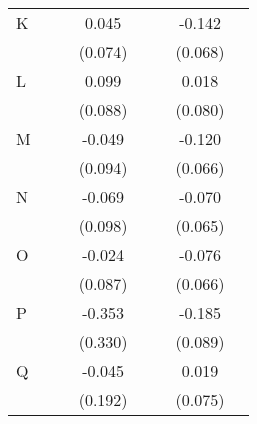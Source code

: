 \begin{longtable}{l*{3}{c}|l*{3}{c}}
		K                   &                     &                     &       0.045         &                     &                     &      -0.142\sym{*}  \\
		&                     &                     &     (0.074)         &                     &                     &     (0.068)         \\
		L                   &                     &                     &       0.099         &                     &                     &       0.018         \\
		&                     &                     &     (0.088)         &                     &                     &     (0.080)         \\
		M                   &                     &                     &      -0.049         &                     &                     &      -0.120         \\
		&                     &                     &     (0.094)         &                     &                     &     (0.066)         \\
		N                   &                     &                     &      -0.069         &                     &                     &      -0.070         \\
		&                     &                     &     (0.098)         &                     &                     &     (0.065)         \\
		O                   &                     &                     &      -0.024         &                     &                     &      -0.076         \\
		&                     &                     &     (0.087)         &                     &                     &     (0.066)         \\
		P                   &                     &                     &      -0.353         &                     &                     &      -0.185\sym{*}  \\
		&                     &                     &     (0.330)         &                     &                     &     (0.089)         \\
		Q                   &                     &                     &      -0.045         &                     &                     &       0.019         \\
		&                     &                     &     (0.192)         &                     &                     &     (0.075)         \\

\end{longtable}
